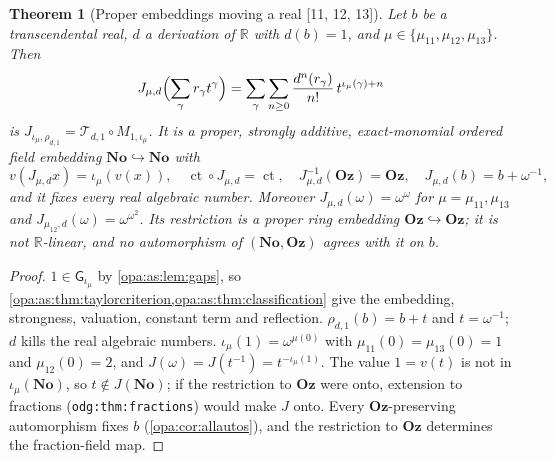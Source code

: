 \documentclass[11pt,oneside]{article}
\numberwithin{equation}{section}
\newtheorem{theorem}{Theorem}[section]
\theoremstyle{definition}
\theoremstyle{remark}
\newcommand{\No}{\mathbf{No}}
\newcommand{\Oz}{\mathbf{Oz}}
\newcommand{\R}{\mathbb R}
\newcommand{\ct}{\operatorname{ct}}
\newcommand{\src}[1]{\textup{\textsf{\small[#1]}}}
\newcommand{\lbl}[1]{\nolinkurl{#1}}
\newcommand{\gap}{\mathsf G}
\begin{document}
\begin{theorem}[Proper embeddings moving a real \src{11, 12, 13}]\label{opa:as:thm:explicit}
Let $b$ be a transcendental real, $d$ a derivation of $\R$ with $d(b)=1$, and
$\mu\in\{\mu_{11},\mu_{12},\mu_{13}\}$. Then
\begin{equation}\label{opa:as:eq:explicit}
 J_{\mu,d}\Bigl(\sum_\gamma r_\gamma t^\gamma\Bigr)=\sum_\gamma\sum_{n\ge0}\frac{d^n(r_\gamma)}{n!}\,
 t^{\iota_\mu(\gamma)+n}
\end{equation}
is $J_{\iota_\mu,\rho_{d,1}}=\mathcal T_{d,1}\circ M_{1,\iota_\mu}$. It is a proper, strongly additive,
exact-monomial ordered field embedding $\No\hookrightarrow\No$ with
\[
 v(J_{\mu,d}x)=\iota_\mu(v(x)),\quad \ct\circ J_{\mu,d}=\ct,\quad J_{\mu,d}^{-1}(\Oz)=\Oz,\quad
 J_{\mu,d}(b)=b+\omega^{-1},
\]
and it fixes every real algebraic number. Moreover $J_{\mu,d}(\omega)=\omega^\omega$ for
$\mu=\mu_{11},\mu_{13}$ and $J_{\mu_{12},d}(\omega)=\omega^{\omega^2}$. Its restriction is a proper ring
embedding $\Oz\hookrightarrow\Oz$; it is not $\R$-linear, and no automorphism of $(\No,\Oz)$ agrees with
it on $b$.
\end{theorem}
\begin{proof}
$1\in\gap_{\iota_\mu}$ by \cref{opa:as:lem:gaps}, so \cref{opa:as:thm:taylorcriterion,opa:as:thm:classification}
give the embedding, strongness, valuation, constant term and reflection. $\rho_{d,1}(b)=b+t$ and
$t=\omega^{-1}$; $d$ kills the real algebraic numbers. $\iota_\mu(1)=\omega^{\mu(0)}$ with $\mu_{11}(0)=\mu_{13}(0)=1$
and $\mu_{12}(0)=2$, and $J(\omega)=J(t^{-1})=t^{-\iota_\mu(1)}$. The value $1=v(t)$ is not in
$\iota_\mu(\No)$, so $t\notin J(\No)$; if the restriction to $\Oz$ were onto, extension to fractions
(\lbl{odg:thm:fractions}) would make $J$ onto. Every $\Oz$-preserving automorphism fixes $b$
(\cref{opa:cor:allautos}), and the restriction to $\Oz$ determines the fraction-field map.
\end{proof}
\end{document}
